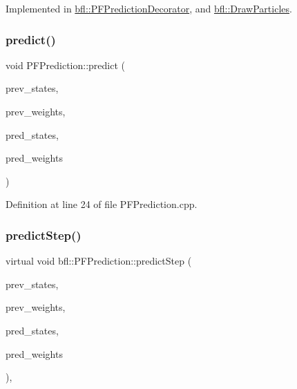 Implemented in \mbox{\hyperlink{classbfl_1_1PFPredictionDecorator_afad4d92333c84f909c41bd589b839113}{bfl\+::\+P\+F\+Prediction\+Decorator}}, and \mbox{\hyperlink{classbfl_1_1DrawParticles_a7a7ebf5a7ea10747db1bd8ab03390107}{bfl\+::\+Draw\+Particles}}.

\mbox{\label{classbfl_1_1PFPrediction_a54986f12509d3d997232c4e926420c90}} 
\subsubsection{\texorpdfstring{predict()}{predict()}}
{\footnotesize\ttfamily void P\+F\+Prediction\+::predict (\begin{DoxyParamCaption}\item[{const Eigen\+::\+Ref$<$ const Eigen\+::\+Matrix\+Xf $>$ \&}]{prev\+\_\+states,  }\item[{const Eigen\+::\+Ref$<$ const Eigen\+::\+Vector\+Xf $>$ \&}]{prev\+\_\+weights,  }\item[{Eigen\+::\+Ref$<$ Eigen\+::\+Matrix\+Xf $>$}]{pred\+\_\+states,  }\item[{Eigen\+::\+Ref$<$ Eigen\+::\+Vector\+Xf $>$}]{pred\+\_\+weights }\end{DoxyParamCaption})}



Definition at line 24 of file P\+F\+Prediction.\+cpp.

\mbox{\label{classbfl_1_1PFPrediction_a2488a3f3bf2345b4723d96cd7fda5491}} 
\subsubsection{\texorpdfstring{predict\+Step()}{predictStep()}}
{\footnotesize\ttfamily virtual void bfl\+::\+P\+F\+Prediction\+::predict\+Step (\begin{DoxyParamCaption}\item[{const Eigen\+::\+Ref$<$ const Eigen\+::\+Matrix\+Xf $>$ \&}]{prev\+\_\+states,  }\item[{const Eigen\+::\+Ref$<$ const Eigen\+::\+Vector\+Xf $>$ \&}]{prev\+\_\+weights,  }\item[{Eigen\+::\+Ref$<$ Eigen\+::\+Matrix\+Xf $>$}]{pred\+\_\+states,  }\item[{Eigen\+::\+Ref$<$ Eigen\+::\+Vector\+Xf $>$}]{pred\+\_\+weights }\end{DoxyParamCaption})\hspace{0.3cm}{\ttfamily [protected]}, {}}



